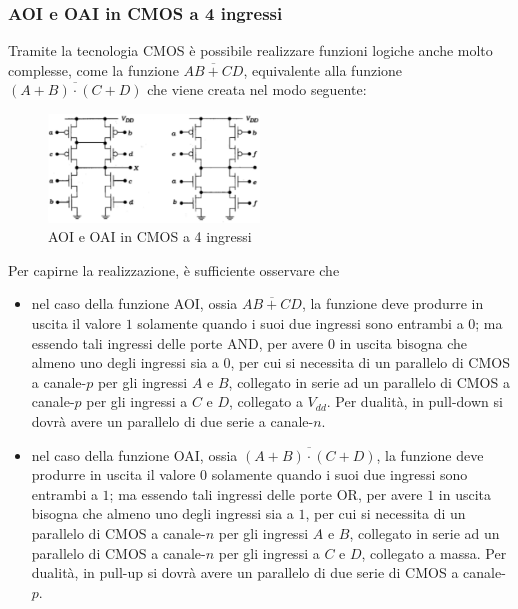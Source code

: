 \documentclass[a4paper]{extarticle}
\begin{document}
\vspace{1em}
\noindent
\subsubsection{AOI e OAI in CMOS a 4 ingressi}
Tramite la tecnologia CMOS è possibile realizzare funzioni logiche anche molto complesse, come la funzione $\overline{AB+CD}$, equivalente alla funzione $\overline{(A+B) \cdot (C+D)}$ che viene creata nel modo seguente:

\begin{figure}[H]
    \centering
    \includegraphics[width=0.5\textwidth]{aoi-oai-cmos-4-ingressi.png}
    \caption{AOI e OAI in CMOS a 4 ingressi}
    \label{fig:aoi_oai_cmos_4_ingressi}
\end{figure}

\vspace{1em}
\noindent
Per capirne la realizzazione, è sufficiente osservare che
\begin{itemize}
    \item nel caso della funzione AOI, ossia $\overline{AB+CD}$, la funzione deve produrre in uscita il valore $1$ solamente quando i suoi due ingressi sono entrambi a $0$; ma essendo tali ingressi delle porte AND, per avere $0$ in uscita bisogna che almeno uno degli ingressi sia a $0$, per cui si necessita di un parallelo di CMOS a canale-$p$ per gli ingressi $A$ e $B$, collegato in serie ad un parallelo di CMOS a canale-$p$ per gli ingressi a $C$ e $D$, collegato a $V_{dd}$. Per dualità, in pull-down si dovrà avere un parallelo di due serie a canale-$n$.
    \item nel caso della funzione OAI, ossia $\overline{(A+B) \cdot (C+D)}$, la funzione deve produrre in uscita il valore $0$ solamente quando i suoi due ingressi sono entrambi a $1$; ma essendo tali ingressi delle porte OR, per avere $1$ in uscita bisogna che almeno uno degli ingressi sia a $1$, per cui si necessita di un parallelo di CMOS a canale-$n$ per gli ingressi $A$ e $B$, collegato in serie ad un parallelo di CMOS a canale-$n$ per gli ingressi a $C$ e $D$, collegato a massa. Per dualità, in pull-up si dovrà avere un parallelo di due serie di CMOS a canale-$p$.
\end{itemize}
\end{document}
